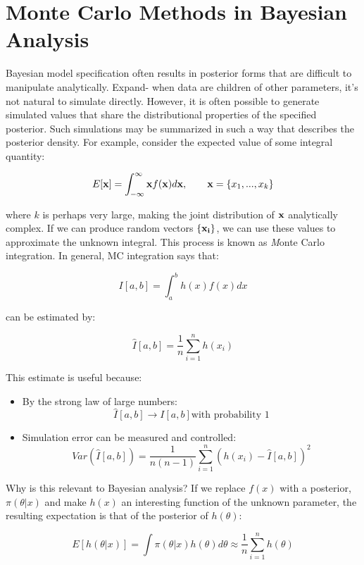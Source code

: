 \documentclass[]{book}
\begin{document}

\section{Monte Carlo Methods in Bayesian Analysis}

Bayesian model specification often results in posterior forms that are difficult to manipulate analytically. Expand- when data are children of other parameters, it's not natural to simulate directly. However, it is often possible to generate simulated values that share the distributional properties of the specified posterior. Such simulations may be summarized in such a way that describes the posterior density. For example, consider the expected value of some integral quantity:

\[
E[{\bf x}] = \int_{-\infty}^{\infty} {\bf x} f({\bf x}) d{\bf x}, \qquad
{\bf x} = \{x_1,...,x_k\}
\]

\noindent where $k$ is perhaps very large, making the joint distribution of ${\bf x}$ analytically complex. If we can produce random vectors $\{{\bf x_i}\}$, we can use these values to approximate the unknown integral. This process is known as {\emph Monte Carlo integration}. In general, MC integration says that:

\[
I[a,b] = \int_a^b h(x) f(x) dx
\]

\noindent can be estimated by:

\[
\hat{I}[a,b] = \frac{1}{n}\sum_{i=1}^n h(x_i)
\]

\noindent This estimate is useful because:

\begin{itemize}
\item
By the strong law of large numbers:
\[\hat{I}[a,b] \rightarrow I[a,b] \mbox{with probability 1}\]
\item
Simulation error can be measured and controlled:
\[Var(\hat{I}[a,b]) = \frac{1}{n(n-1)}\sum_{i=1}^n (h(x_i)-\hat{I}[a,b])^2\]
\end{itemize}

Why is this relevant to Bayesian analysis? If we replace $f(x)$ with a posterior, $\pi(\theta|x)$ and make $h(x)$ an interesting function of the unknown parameter, the resulting expectation is that of the posterior of $h(\theta)$:

\[
E[h(\theta|x)] = \int \pi(\theta|x) h(\theta) d\theta \approx \frac{1}{n}\sum_{i=1}^n h(\theta)
\]
\end{document}
